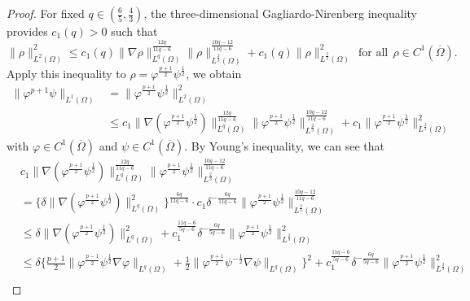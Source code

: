 \documentclass[12pt]{article}
\theoremstyle{plain}
\theoremstyle{definition}
\numberwithin{equation}{section}
\begin{document}
\begin{proof}
For fixed $q\in(\frac6 5, \frac4 3)$, the three-dimensional Gagliardo-Nirenberg inequality provides $c_1(q)>0$ such that
    \begin{equation*}
        \|\rho\|_{L^2(\Omega)}^2\leq c_1(q)\|\nabla\rho\|_{L^q(\Omega)}^{\frac{12q}{11q-6}}\|\rho\|_{L^{\frac2 3}(\Omega)}^{\frac{10q-12}{11q-6}}+c_1(q)\|\rho\|_{L^{\frac2 3}(\Omega)}^{2}~~\mbox{for all}~~\rho\in C^1(\overline{\Omega}).
    \end{equation*}
    Apply this inequality to $\rho=\varphi^{\frac{p+1}{2}}\psi^{\frac12}$, we obtain
    \begin{equation}\label{3.28}
    \begin{split}
        \|\varphi^{p+1}\psi\|_{L^1(\Omega)}&=\|\varphi^{\frac{p+1}{2}}\psi^{\frac1 2}\|_{L^2(\Omega)}^2\\
        &\leq c_1\|\nabla(\varphi^{\frac{p+1}{2}}\psi^{\frac1 2})\|_{L^q(\Omega)}^{\frac{12q}{11q-6}}\|\varphi^{\frac{p+1}{2}}\psi^{\frac1 2}\|_{L^{\frac2 3}(\Omega)}^{\frac{10q-12}{11q-6}}+c_1\|\varphi^{\frac{p+1}{2}}\psi^{\frac1 2}\|_{L^{\frac2 3}(\Omega)}^{2}
        \end{split}
    \end{equation}
   with $\varphi\in C^1(\overline{\Omega})$ and $\psi\in C^1(\overline{\Omega})$. By  Young's inequality, we can see that
    \begin{equation}\label{3.29}
    \begin{split}
       &c_1\|\nabla(\varphi^{\frac{p+1}{2}}\psi^{\frac1 2})\|_{L^q(\Omega)}^{\frac{12q}{11q-6}}\|\varphi^{\frac{p+1}{2}}\psi^{\frac1 2}\|_{L^{\frac2 3}(\Omega)}^{\frac{10q-12}{11q-6}}\\
       &=\bigg\{\delta\|\nabla(\varphi^{\frac{p+1}{2}}\psi^{\frac1 2})\|_{L^q(\Omega)}^{2}\bigg\}^{\frac{6q}{11q-6}}\cdot c_1\delta^{-\frac{6q}{11q-6}}\|\varphi^{\frac{p+1}{2}}\psi^{\frac1 2}\|_{L^{\frac2 3}(\Omega)}^{\frac{10q-12}{11q-6}}\\
       &\leq\delta\|\nabla(\varphi^{\frac{p+1}{2}}\psi^{\frac1 2})\|_{L^q(\Omega)}^{2}+c_1^{\frac{11q-6}{5q-6}}\delta^{-\frac{6q}{5q-6}}\|\varphi^{\frac{p+1}{2}}\psi^{\frac1 2}\|_{L^{\frac2 3}(\Omega)}^{2}\\
       &\leq\delta\bigg\{\frac{p+1}{2}\|\varphi^{\frac{p-1}{2}}\psi^{\frac1 2}\nabla\varphi\|_{L^q(\Omega)}+\frac{1}{2}\|\varphi^{\frac{p+1}{2}}\psi^{-\frac1 2}\nabla\psi\|_{L^q(\Omega)}\bigg\}^2
       +c_1^{\frac{11q-6}{5q-6}}\delta^{-\frac{6q}{5q-6}}\|\varphi^{\frac{p+1}{2}}\psi^{\frac1 2}\|_{L^{\frac2 3}(\Omega)}^{2}\\

\end{split}
\end{equation}
\end{proof}
\end{document}
